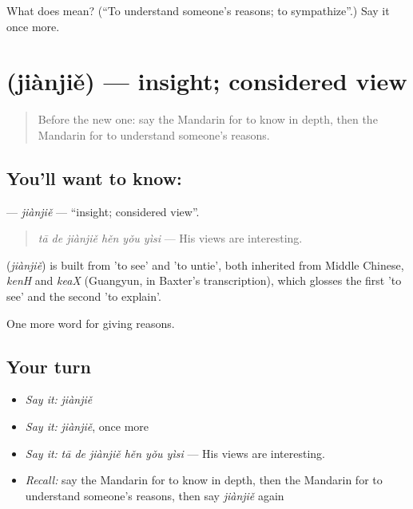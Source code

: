 \begin{tcolorbox}[breakable,colback=teal!4,colframe=teal!35!black,title={Before you move on}]
What does  mean? (\textquotedblleft{}To understand someone's reasons; to sympathize\textquotedblright{}.) Say it once more.
\end{tcolorbox}
\section[\texorpdfstring{\zh{见解} (jiànjiě)}{见解 (jiànjiě)}]{ (jiànjiě) — insight; considered view}

\label{lesson:ZH-C367-jianjie}



\begin{quote}
Before the new one: say the Mandarin for to know in depth, then the Mandarin for to understand someone's reasons.
\end{quote}

\subsection*{You'll want to know: }
\textbf{} — \emph{jiànjiě} — \textquotedblleft{}insight; considered view\textquotedblright{}.

\begin{quote}
\textbf{} \emph{tā de jiànjiě hěn yǒu yìsi} — His views are interesting.
\end{quote}

\begin{cousinweb}
\textbf{} (\emph{jiànjiě}) is built from  'to see' and  'to untie', both inherited from Middle Chinese, \emph{kenH} and \emph{keaX} (Guangyun, in Baxter's transcription), which glosses the first 'to see' and the second 'to explain'.
\end{cousinweb}

\begin{grammarlens}[title={What you've built}]
One more word for giving reasons.
\end{grammarlens}

\subsection*{Your turn}
\begin{itemize}
\raggedright
  \item \emph{Say it:} \emph{jiànjiě}
  \item \emph{Say it:} \emph{jiànjiě}, once more
  \item \emph{Say it:} \emph{tā de jiànjiě hěn yǒu yìsi} — His views are interesting.
  \item \emph{Recall:} say the Mandarin for to know in depth, then the Mandarin for to understand someone's reasons, then say \emph{jiànjiě} again
\end{itemize}

